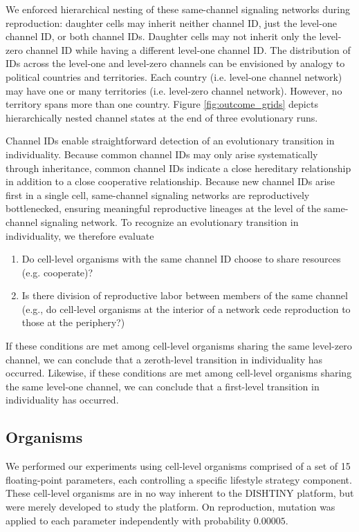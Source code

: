 We enforced hierarchical nesting of these same-channel signaling networks during reproduction:
daughter cells may inherit neither channel ID, just the level-one channel ID, or both channel IDs.
Daughter cells may not inherit only the level-zero channel ID while having a different level-one channel ID.
The distribution of IDs across the level-one and level-zero channels can be envisioned by analogy to political countries and territories.
Each country (i.e. level-one channel network) may have one or many territories (i.e. level-zero channel network).
However, no territory spans more than one country.
Figure \ref{fig:outcome_grids} depicts hierarchically nested channel states at the end of three evolutionary runs.

Channel IDs enable straightforward detection of an evolutionary transition in individuality.
Because common channel IDs may only arise systematically through inheritance, common channel IDs indicate a close hereditary relationship in addition to a close cooperative relationship.
Because new channel IDs arise first in a single cell, same-channel signaling networks are reproductively bottlenecked, ensuring meaningful reproductive lineages at the level of the same-channel signaling network.
To recognize an evolutionary transition in individuality, we therefore evaluate
\begin{enumerate}
\item Do cell-level organisms with the same channel ID choose to share resources (e.g. cooperate)?
\item Is there division of reproductive labor between members of the same channel (e.g., do cell-level organisms at the interior of a network cede reproduction to those at the periphery?)
\end{enumerate}
If these conditions are met among cell-level organisms sharing the same level-zero channel, we can conclude that a zeroth-level transition in individuality has occurred.
Likewise, if these conditions are met among cell-level organisms sharing the same level-one channel, we can conclude that a first-level transition in individuality has occurred.

\subsection{Organisms}

We performed our experiments using cell-level organisms comprised of a set of 15 floating-point parameters, each controlling a specific lifestyle strategy component.
These cell-level organisms are in no way inherent to the DISHTINY platform, but were merely developed to study the platform.
On reproduction, mutation was applied to each parameter independently with probability $0.00005$.

